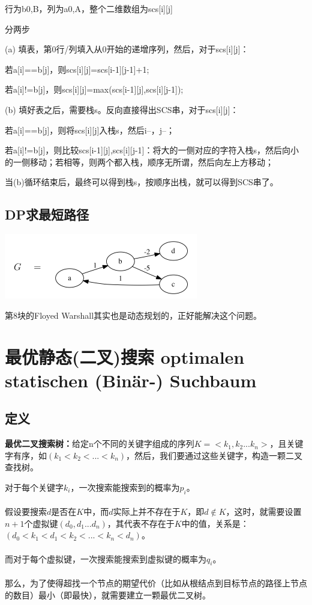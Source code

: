 \documentclass[a4paper]{article}    %
\begin{document}
行为b{0,B}，列为a{0,A}，整个二维数组为scs[i][j]

\noindent 分两步

(a) 填表，第0行/列填入从0开始的递增序列，然后，对于scs[i][j]：

\indent\indent 若a[i]==b[j]，则scs[i][j]=scs[i-1][j-1]+1;

\indent\indent 若a[i]!=b[j]，则scs[i][j]=max(scs[i-1][j],scs[i][j-1]);

(b) 填好表之后，需要栈s。反向直接得出SCS串，对于scs[i][j]：

\indent\indent 若a[i]==b[j]，则将scs[i][j]入栈s，然后i--，j--；

\indent\indent 若a[i]!=b[j]，则比较scs[i-1][j],scs[i][j-1]：将大的一侧对应的字符入栈s，然后向小的一侧移动；若相等，则两个都入栈，顺序无所谓，然后向左上方移动；

当(b)循环结束后，最终可以得到栈s，按顺序出栈，就可以得到SCS串了。

\subsection{DP求最短路径}

\begin{center}
    \includegraphics[scale=0.6]{40.png}
\end{center}

第8块的Floyed Warshall其实也是动态规划的，正好能解决这个问题。

\section{最优静态(二叉)搜索 optimalen statischen (Binär-) Suchbaum}

\subsection{定义}

\noindent \textbf{最优二叉搜索树：}给定n个不同的关键字组成的序列$K=<k_1,k_2...k_n>$，且关键字有序，如$(k_1<k_2<...<k_n)$，然后，我们要通过这些关键字，构造一颗二叉查找树。

对于每个关键字$k_i$，一次搜索能搜索到的概率为$p_i$。
\\
\\
\indent 假设要搜索$d$是否在$K$中，而$d$实际上并不存在于$K$，即$d\notin K$，这时，就需要设置$n+1$个虚拟键$(d_0,d_1...d_n)$，其代表不存在于$K$中的值，关系是：$(d_0<k_1<d_1<k_2<...<k_n<d_n)$。
\\
\\
\indent 而对于每个虚拟键，一次搜索能搜索到虚拟键的概率为$q_i$。
\\
\\
\indent 那么，为了使得超找一个节点的期望代价（比如从根结点到目标节点的路径上节点的数目）最小（即最快），就需要建立一颗最优二叉树。
\end{document}
